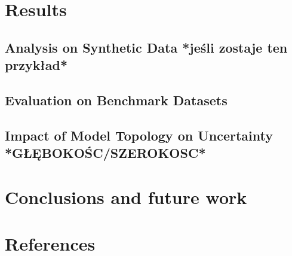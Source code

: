\documentclass[11pt,a4paper]{report}
\begin{document}











\chapter{Results}
\section{Analysis on Synthetic Data *jeśli zostaje ten przykład*}
\section{Evaluation on Benchmark Datasets}
\section{Impact of Model Topology on Uncertainty *GŁĘBOKOŚC/SZEROKOSC*}

    
\chapter{Conclusions and future work}


\chapter{References} %


 
\end{document}
